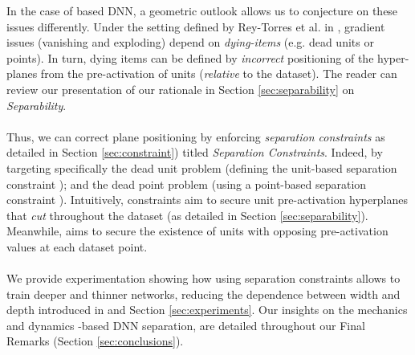In the case of \ReLU based DNN, a geometric outlook allows us to conjecture on these issues differently. Under the setting defined by Rey-Torres et al. in \cite{reyRiera2019ModellingClassificationReLU},  gradient issues (vanishing and exploding) depend on \emph{dying-items} (e.g. dead units or points). In turn, dying items can be defined by  \emph{incorrect} positioning of the hyper-planes from the pre-activation of \ReLU units (\emph{relative} to the dataset). The reader can review our presentation of our rationale in Section \ref{sec:separability} on \emph{Separability}. 
\\\\
Thus, we can correct plane positioning by enforcing \emph{separation constraints} as detailed in Section \ref{sec:constraint}) titled \emph{Separation Constraints}. Indeed, by targeting specifically the dead unit problem (defining the unit-based separation constraint \SepUnit); and the dead point problem (using a point-based separation constraint \SepPoint). Intuitively, \SepUnit constraints aim to secure unit pre-activation hyperplanes that \emph{cut} throughout the dataset (as detailed in Section \ref{sec:separability}). Meanwhile,  \SepPoint aims to secure the existence of units with opposing pre-activation values at each dataset point. 
\\\\
We provide experimentation showing how using separation constraints allows to train deeper and thinner networks, reducing the dependence between width and depth introduced in \cite{simpnet} and \cite{densenet} Section \ref{sec:experiments}. Our insights on the mechanics and dynamics \ReLU-based DNN separation, are detailed throughout our Final Remarks (Section \ref{sec:conclusions}).  

